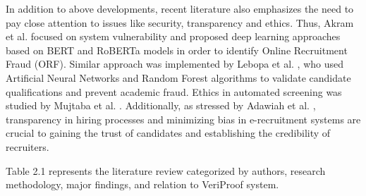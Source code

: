 In addition to above developments, recent literature also emphasizes the need to pay close attention to issues like security, transparency and ethics. Thus, Akram et al. \cite{Akram2024} focused on system vulnerability and proposed deep learning approaches based on BERT and RoBERTa models in order to identify Online Recruitment Fraud (ORF). Similar approach was implemented by Lebopa et al. \cite{Lebopa2025}, who used Artificial Neural Networks and Random Forest algorithms to validate candidate qualifications and prevent academic fraud. Ethics in automated screening was studied by Mujtaba et al. \cite{Mujtaba2024}. Additionally, as stressed by Adawiah et al. \cite{Adawiah2024}, transparency in hiring processes and minimizing bias in e-recruitment systems are crucial to gaining the trust of candidates and establishing the credibility of recruiters.

Table 2.1 represents the literature review categorized by authors, research methodology, major findings, and relation to VeriProof system.

